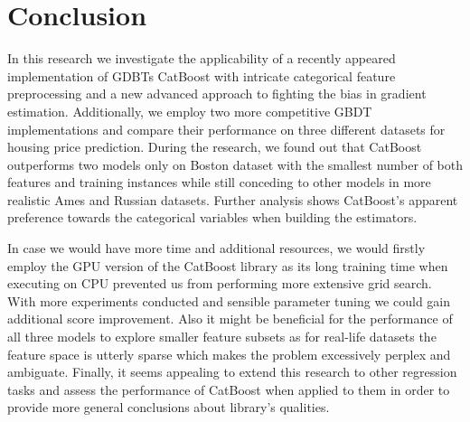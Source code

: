 \section{Conclusion}
\label{sec:conclusion}

In this research we investigate the applicability of a recently appeared implementation of GDBTs CatBoost with intricate categorical feature preprocessing and a new advanced approach to fighting the bias in gradient estimation. Additionally, we employ two more competitive GBDT implementations and compare their performance on three different datasets for housing price prediction. During the research, we found out that CatBoost outperforms two models only on Boston dataset with the smallest number of both features and training instances while still conceding to other models in more realistic Ames and Russian datasets. Further analysis shows CatBoost's apparent preference towards the categorical variables when building the estimators.

In case we would have more time and additional resources, we would firstly employ the GPU version of the CatBoost library as its long training time when executing on CPU prevented us from performing more extensive grid search. With more experiments conducted and sensible parameter tuning we could gain additional score improvement. Also it might be beneficial for the performance of all three models to explore smaller feature subsets as for real-life datasets the feature space is utterly sparse which makes the problem excessively perplex and ambiguate. Finally, it seems appealing to extend this research to other regression tasks and assess the performance of CatBoost when applied to them in order to provide more general conclusions about library's qualities.